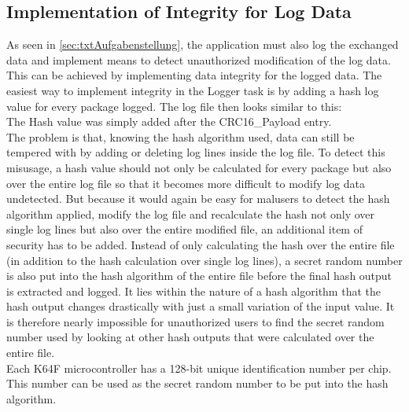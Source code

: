 \subsection{Implementation of Integrity for Log Data}
As seen in \autoref{sec:txtAufgabenstellung}, the application must also log the exchanged data and implement means to detect unauthorized modification of the log data. This can be achieved by implementing data integrity for the logged data.
The easiest way to implement integrity in the Logger task is by adding a hash log value for every package logged. The log file then looks similar to this:\\
\noindent{}
The Hash value was simply added after the CRC16\_Payload entry.\\
The problem is that, knowing the hash algorithm used, data can still be tempered with by adding or deleting log lines inside the log file. To detect this misusage, a hash value should not only be calculated for every package but also over the entire log file so that it becomes more difficult to modify log data undetected. But because it would again be easy for malusers to detect the hash algorithm applied, modify the log file and recalculate the hash not only over single log lines but also over the entire modified file, an additional item of security has to be added. Instead of only calculating the hash over the entire file (in addition to the hash calculation over single log lines), a secret random number is also put into the hash algorithm of the entire file before the final hash output is extracted and logged. It lies within the nature of a hash algorithm that the hash output changes drastically with just a small variation of the input value. It is therefore nearly impossible for unauthorized users to find the secret random number used by looking at other hash outputs that were calculated over the entire file.\\
Each K64F microcontroller has a 128-bit unique identification number per chip. This number can be used as the secret random number to be put into the hash algorithm.\\
